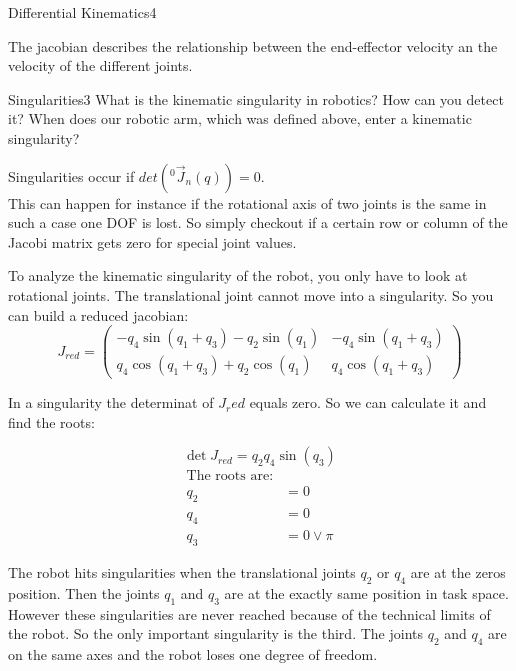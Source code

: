 \begin{questions}
\begin{question}{Differential Kinematics}{4}
\begin{answer}
	The jacobian describes the relationship between the end-effector velocity an the velocity of the different joints.
	
	\end{answer}

\end{question}


\begin{question}{Singularities}{3}
What is the kinematic singularity in robotics? How can you detect it? When does our robotic arm, which was defined above, enter a kinematic singularity?

\begin{answer}
	Singularities occur if $det(^0\vec{J}_n(q))=0$. \\This can happen for instance if the rotational axis of two joints is the same in such a case one DOF is lost. So simply checkout if a certain row or column of the Jacobi matrix gets zero for special joint values. 
	
	To analyze the kinematic singularity of the robot, you only have to look at rotational joints. The translational joint cannot move into a singularity. So you can build a reduced jacobian:
	\begin{equation}
		J_{red} = 
		\begin{pmatrix}
			-q_4\sin(q_1+q_3) - q_2\sin(q_1)& -q_4\sin(q_1+q_3)\\
			q_4\cos(q_1+q_3)+q_2\cos(q_1)& q_4\cos(q_1+q_3)
		\end{pmatrix}
		\end{equation}
	
	In a singularity the determinat of $J_red$ equals zero. So we can calculate it and find the roots:
	
	\begin{equation}
		\det J_{red} = q_2 q_4 \sin(q_3)
	\end{equation}
	\begin{equation}
		\begin{split}
			\text{The roots are:}\\
			q_2 &= 0\\
			q_4 &= 0\\
			q_3 &= 0 \lor \pi
		\end{split}
	\end{equation}
	
	The robot hits singularities when the translational joints $q_2$ or $q_4$ are at the zeros position. Then the joints $q_1$ and $q_3$ are at the exactly same position in task space. However these singularities are never reached because of the technical limits of the robot. So the only important singularity is the third. The joints $q_2$ and $q_4$ are on the same axes and the robot loses one degree of freedom.
	

\end{answer}
\end{question}
\end{questions}
